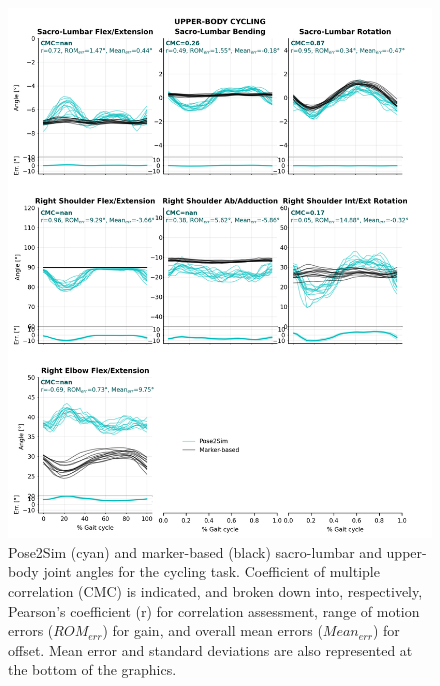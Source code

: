 \begin{figure}[!ht]
	\centering
	\def\svgwidth{1\columnwidth}
	\fontsize{10pt}{10pt}\selectfont
	\includegraphics[height=\dimexpr\textheight-119pt]{"../Annexes/Figures/Fig_QTMBikeUp.png"}
	\caption{Pose2Sim (cyan) and marker-based (black) sacro-lumbar and upper-body joint angles for the cycling task. Coefficient of multiple correlation (CMC) is indicated, and broken down into, respectively, Pearson’s coefficient (r) for correlation assessment, range of motion errors (\(ROM_{err}\)) for gain, and overall mean errors (\(Mean_{err}\)) for offset. Mean error and standard deviations are also represented at the bottom of the graphics.}
	\label{fig_qtmbikeup}
\end{figure}

